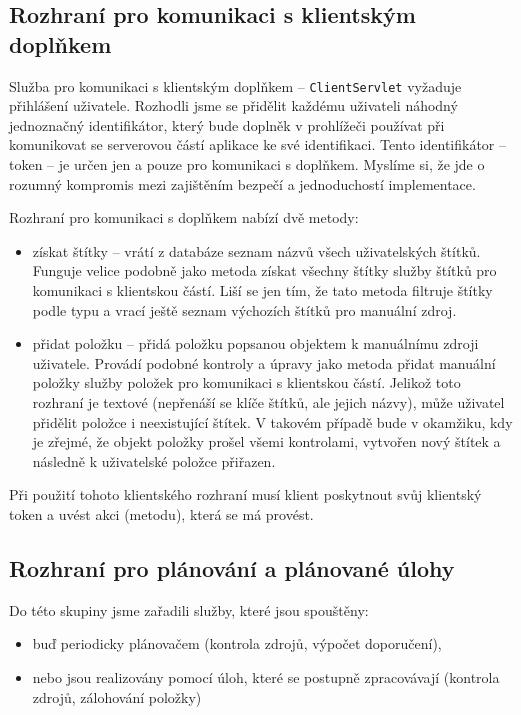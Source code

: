 \subsection{Rozhraní pro komunikaci s klientským doplňkem}

Služba pro komunikaci s klientským doplňkem -- \verb|ClientServlet| vyžaduje přihlášení uživatele.
Rozhodli jsme se přidělit každému uživateli náhodný jednoznačný identifikátor, který bude doplněk v prohlížeči používat při komunikovat se serverovou částí aplikace ke své identifikaci.
Tento identifikátor -- token -- je určen jen a pouze pro komunikaci s doplňkem.
Myslíme si, že jde o rozumný kompromis mezi zajištěním bezpečí a jednoduchostí implementace.

Rozhraní pro komunikaci s doplňkem nabízí dvě metody:
\begin{itemize}
	\item získat štítky -- vrátí z databáze seznam názvů všech uživatelských štítků.
		Funguje velice podobně jako metoda získat všechny štítky služby štítků pro komunikaci s klientskou částí.
		Liší se jen tím, že tato metoda filtruje štítky podle typu a vrací ještě seznam výchozích štítků pro manuální zdroj.
	\item přidat položku -- přidá položku popsanou  objektem k manuálnímu zdroji uživatele.
		Provádí podobné kontroly a úpravy jako metoda přidat manuální položky služby položek pro komunikaci s klientskou částí.
		Jelikož toto rozhraní je textové (nepřenáší se klíče štítků, ale jejich názvy), může uživatel přidělit položce i neexistující štítek.
		V takovém případě bude v okamžiku, kdy je zřejmé, že objekt položky prošel všemi kontrolami, vytvořen nový štítek a následně k uživatelské položce přiřazen.
\end{itemize}

Při použití tohoto klientského rozhraní musí klient poskytnout svůj klientský token a uvést akci (metodu), která se má provést.

\subsection{Rozhraní pro plánování a plánované úlohy}

Do této skupiny jsme zařadili služby, které jsou spouštěny:
\begin{itemize}
	\item buď periodicky plánovačem  (kontrola zdrojů, výpočet doporučení),
	\item nebo jsou realizovány pomocí úloh, které se postupně zpracovávají (kontrola zdrojů, zálohování položky)
\end{itemize}

